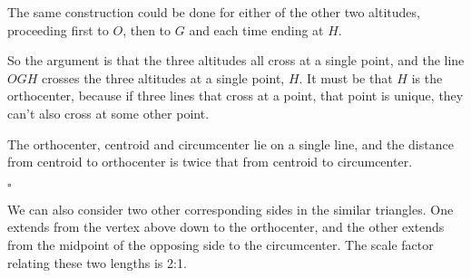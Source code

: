 \documentclass[11pt, oneside]{article}
\begin{document}
The same construction could be done for either of the other two altitudes, proceeding first to $O$, then to $G$ and each time ending at $H$.

So the argument is that the three altitudes all cross at a single point, and the line $OGH$ crosses the three altitudes at a single point, $H$.  It must be that $H$ is the orthocenter, because if three lines that cross at a point, that point is unique, they can't also cross at some other point.

The orthocenter, centroid and circumcenter lie on a single line, and the distance from centroid to orthocenter is twice that from centroid to circumcenter.

$\square$

We can also consider two other corresponding sides in the similar triangles.  One extends from the vertex above down to the orthocenter, and the other extends from the midpoint of the opposing side to the circumcenter.  The scale factor relating these two lengths is 2:1.
\end{document}
